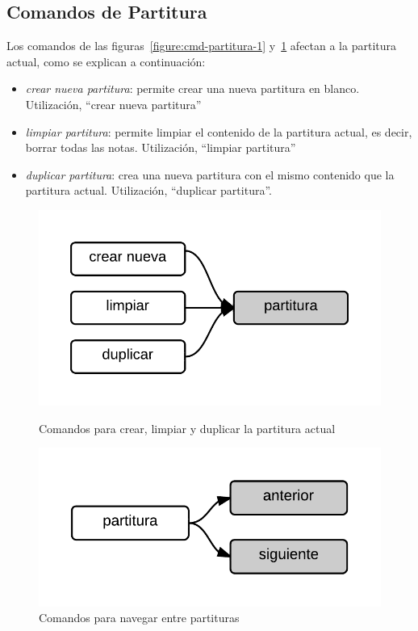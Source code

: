 \subsection{Comandos de Partitura}

Los comandos de las figuras~\ref{figure:cmd-partitura-1} y~\ref{figure:cmd-partitura-2} afectan a
la partitura actual, como se explican a continuaci\'on:

\begin{itemize}
    \item \emph{crear nueva  partitura}:  permite crear una nueva partitura en blanco. Utilizaci\'on, ``crear nueva partitura''
    \item \emph{limpiar  partitura}: permite limpiar el contenido de la partitura actual, es decir, borrar todas las notas. Utilizaci\'on, ``limpiar partitura''
    \item \emph{duplicar partitura}: crea una nueva partitura con el mismo contenido que la partitura actual. Utilizaci\'on, ``duplicar partitura''.
\end{itemize}

\begin{figure}[H]
\begin{minipage}[b]{0.5\linewidth}
\centering
\includegraphics[width=0.6\linewidth]{./graphics/partitura-1.png}
\caption{Comandos para crear, limpiar y duplicar la partitura actual}
\label{figure:cmd-partitura-1}
\end{minipage}
\quad
\begin{minipage}[b]{0.5\linewidth}
\centering
\includegraphics[width=0.6\linewidth]{./graphics/partitura-2.png}
\caption{Comandos para navegar entre partituras}
\label{figure:cmd-partitura-2}
\end{minipage}
\end{figure} 

